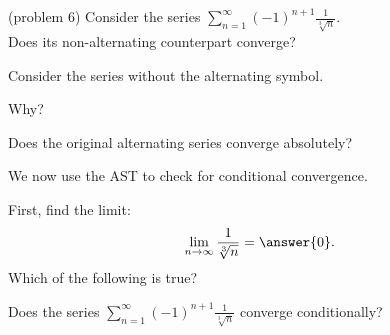 \documentclass{ximera}
\begin{document}
\begin{problem}(problem 6)
Consider the series $\displaystyle{\sum_{n=1}^\infty (-1)^{n+1} \frac{1}{\sqrt[3] n}}$.\\
Does its non-alternating counterpart converge?
\begin{hint} 
Consider the series without the alternating symbol.
\end{hint}
\begin{multipleChoice}
\end{multipleChoice}

Why?
\begin{multipleChoice}
\end{multipleChoice}




Does the original alternating series converge absolutely?
\begin{multipleChoice}
\end{multipleChoice}

We now use the AST to check for conditional convergence.

First, find the limit:
\[
\lim_{n\to\infty} \frac{1}{\sqrt[3] n} = \answer{0}.
\]
Which of the following is true?
\begin{multipleChoice}
\end{multipleChoice}


Does the series $\displaystyle{\sum_{n=1}^\infty (-1)^{n+1} \frac{1}{\sqrt[3] n}}$ converge conditionally?
\begin{multipleChoice}
\end{multipleChoice}

\end{problem}
\end{document}
